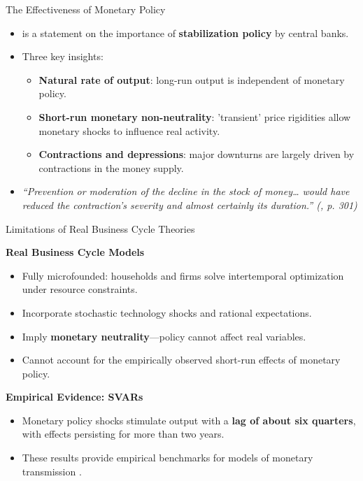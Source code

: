 \documentclass[11pt,aspectratio=169]{beamer}
\begin{document}
\begin{frame}{The Effectiveness of Monetary Policy}
\small


\begin{itemize}
  \item {\textcite{friedmanschwartz1963}}
is a statement on the importance of \textbf{stabilization policy} by central banks.

  \item Three key insights:
    \begin{itemize}
      \item \textbf{Natural rate of output}: long-run output is independent of monetary policy.
      \item \textbf{Short-run monetary non-neutrality}: 'transient' price rigidities allow monetary shocks to influence real activity.
      \item \textbf{Contractions and depressions}: major downturns are largely driven by contractions in the money supply.
    \end{itemize}

  \item \emph{“Prevention or moderation of the decline in the stock of money…  
          would have reduced the contraction’s severity and almost certainly its duration.” (\textcite{friedmanschwartz1963}, p. 301)}
\end{itemize}

\end{frame}

\begin{frame}{Limitations of Real Business Cycle Theories}
\small

\textbf{Real Business Cycle Models \parencite{kydlandprescott1982}}
\begin{itemize}
  \item Fully microfounded: households and firms solve intertemporal optimization under resource constraints.
  \item Incorporate stochastic technology shocks and rational expectations.
  \item Imply \textbf{monetary neutrality}—policy cannot affect real variables.
  \item Cannot account for the empirically observed short-run effects of monetary policy.
\end{itemize}

\vspace{0.2cm}

\textbf{Empirical Evidence: SVARs}
\begin{itemize}
  \item Monetary policy shocks stimulate output with a \textbf{lag of about six quarters}, with effects persisting for more than two years.
  \item These results provide empirical benchmarks for models of monetary transmission  
        \parencite{christiano1999, woodford2003}.
\end{itemize}

\end{frame}
\end{document}
